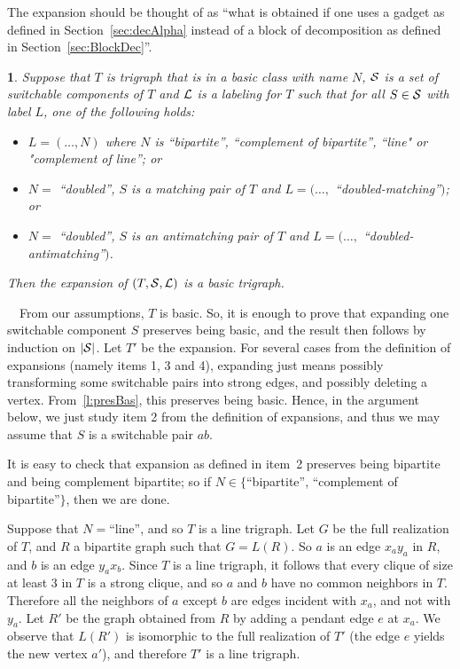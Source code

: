 \documentclass[11 pt] {article}
\newtheorem{theorem}{}[section]
\newcounter{claim}
\newcommand{\Proof}{\setcounter{claim}{0}\noindent{\bf Proof.}\ \ }
\begin{document}
The expansion should be thought of as ``what is obtained if one uses a
gadget as defined in Section~\ref{sec:decAlpha} instead of a
block of decomposition as defined in Section~\ref{sec:BlockDec}''.  

\begin{theorem}
  \label{expBas}
  Suppose that $T$ is trigraph that is in a basic class  with name $N$,
  $\cal S$ is a set of switchable components of $T$ and $\cal L$ is a
  labeling for $T$ such that for all $S\in {\cal S}$ with label $L$,
  one of the following holds:
  \begin{itemize}
  \item $L = (\dots, N)$ where $N$ is ``bipartite'', ``complement of
    bipartite'', ``line" or "complement of line''; or
  \item $N =$ ``doubled'', $S$ is a matching pair of $T$ and $L =
   (\dots,$ ``doubled-matching''$)$; or 
 \item $N =$ ``doubled'', $S$ is an antimatching pair of $T$ and $L =
   (\dots,$ ``doubled-antimatching''$)$. 
 \end{itemize}

 Then the expansion of $(T, {\cal S}, {\cal L})$ is a basic trigraph.
\end{theorem}

\Proof From our assumptions, $T$ is basic.  So, it is enough to prove
that expanding one switchable component $S$ preserves being basic, and
the result then follows by induction on $|\cal S|$. Let $T'$ be the
expansion.  For several cases from the definition of expansions
(namely items 1, 3 and 4), expanding just means possibly transforming
some switchable pairs into strong edges, and possibly deleting a
vertex.  From~\ref{l:presBas}, this preserves being basic. Hence, in
the argument below, we just study item 2 from the definition of
expansions, and thus we may assume that $S$ is a switchable pair
$ab$. 

It is easy to check that expansion as defined in item~2 preserves
being bipartite and being complement bipartite; so if $N \in
\{$``bipartite'', ``complement of bipartite''$\}$, then we are done.

Suppose that $N=$``line'', and so $T$ is a line trigraph.  Let $G$ be
the full realization of $T$, and $R$ a bipartite graph such that $G =
L(R)$.  So $a$ is an edge $x_a y_a$ in $R$, and $b$ is an edge $y_a
x_b$.  Since $T$ is a line trigraph, it follows that every clique of
size at least $3$ in $T$ is a strong clique, and so $a$ and $b$ have
no common neighbors in $T$. Therefore all the neighbors of $a$ except
$b$ are edges incident with $x_a$, and not with $y_a$.  Let $R'$ be
the graph obtained from $R$ by adding a pendant edge $e$ at $x_a$.  We
observe that $L(R')$ is isomorphic to the full realization of $T'$
(the edge $e$ yields the new vertex $a'$), and therefore $T'$ is a
line trigraph.
\end{document}
